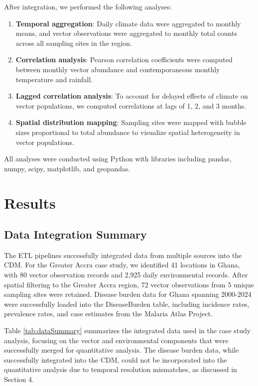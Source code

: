 \documentclass{article}
\begin{document}
After integration, we performed the following analyses:

\begin{enumerate}
    \item \textbf{Temporal aggregation}: Daily climate data were aggregated to monthly means, and vector observations were 
    aggregated to monthly total counts across all sampling sites in the region.
    \item \textbf{Correlation analysis}: Pearson correlation coefficients were computed between monthly vector abundance and 
    contemporaneous monthly temperature and rainfall.
    \item \textbf{Lagged correlation analysis}: To account for delayed effects of climate on vector populations, we computed 
    correlations at lags of 1, 2, and 3 months.
    \item \textbf{Spatial distribution mapping}: Sampling sites were mapped with bubble sizes proportional to total abundance 
    to visualize spatial heterogeneity in vector populations.
\end{enumerate}

All analyses were conducted using Python with libraries including pandas, numpy, scipy, matplotlib, and geopandas.

\section{Results}
\label{sec:results}

\subsection{Data Integration Summary}

\par
The ETL pipelines successfully integrated data from multiple sources into the CDM. For the Greater Accra case study, we 
identified 41 locations in Ghana, with 80 vector observation records and 2,925 daily environmental records. After spatial 
filtering to the Greater Accra region, 72 vector observations from 5 unique sampling sites were retained. Disease burden data 
for Ghana spanning 2000-2024 were successfully loaded into the DiseaseBurden table, including incidence rates, prevalence rates, 
and case estimates from the Malaria Atlas Project.
\par
Table \ref{tab:dataSummary} summarizes the integrated data used in the case study analysis, focusing on the vector and 
environmental components that were successfully merged for quantitative analysis. The disease burden data, while successfully 
integrated into the CDM, could not be incorporated into the quantitative analysis due to temporal resolution mismatches, as 
discussed in Section 4.
\end{document}

